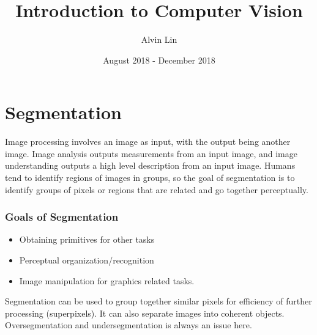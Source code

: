 \documentclass{math}
\title{Introduction to Computer Vision}
\author{Alvin Lin}
\date{August 2018 - December 2018}
\begin{document}
\maketitle

\section*{Segmentation}
Image processing involves an image as input, with the output being another
image. Image analysis outputs measurements from an input image, and image
understanding outputs a high level description from an input image. Humans
tend to identify regions of images in groups, so the goal of segmentation is to
identify groups of pixels or regions that are related and go together
perceptually.

\subsubsection*{Goals of Segmentation}
\begin{itemize}
  \item Obtaining primitives for other tasks
  \item Perceptual organization/recognition
  \item Image manipulation for graphics related tasks.
\end{itemize}
Segmentation can be used to group together similar pixels for efficiency of
further processing (superpixels). It can also separate images into coherent
objects. Oversegmentation and undersegmentation is always an issue here.
\end{document}
